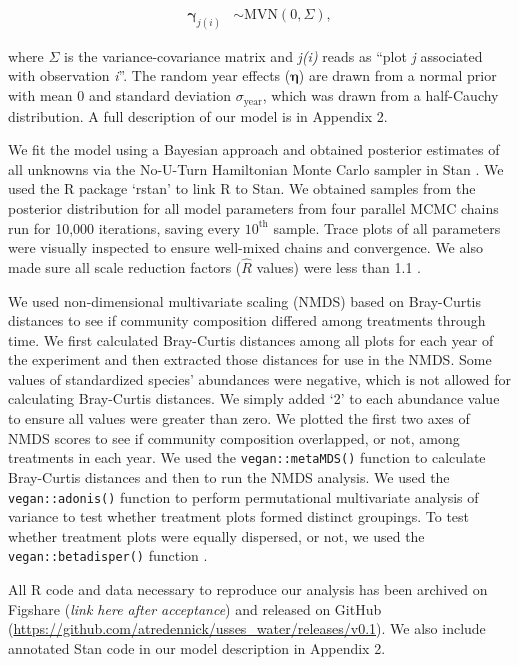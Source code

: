 \documentclass[fleqn,10pt,lineno]{wlpeerj} %
\begin{document}
\begin{align}
\boldsymbol{\gamma}_{j(i)} &\sim \text{MVN} \left( 0, \Sigma  \right),
\end{align}

\noindent{}where \(\Sigma\) is the variance-covariance matrix and
\emph{j(i)} reads as ``plot \emph{j} associated with observation
\emph{i}''. The random year effects (\(\boldsymbol{\eta}\)) are drawn
from a normal prior with mean 0 and standard deviation
\(\sigma_{\text{year}}\), which was drawn from a half-Cauchy
distribution. A full description of our model is in Appendix 2.

We fit the model using a Bayesian approach and obtained posterior
estimates of all unknowns via the No-U-Turn Hamiltonian Monte Carlo
sampler in Stan \citep{stan2016}. We used the R package `rstan'
\citep{rstan2016} to link R \citep{R2016} to Stan. We obtained samples
from the posterior distribution for all model parameters from four
parallel MCMC chains run for 10,000 iterations, saving every
\(10^{\text{th}}\) sample. Trace plots of all parameters were visually
inspected to ensure well-mixed chains and convergence. We also made sure
all scale reduction factors (\(\hat{R}\) values) were less than 1.1
\citep{Gelman2009}.

We used non-dimensional multivariate scaling (NMDS) based on Bray-Curtis
distances to see if community composition differed among treatments
through time. We first calculated Bray-Curtis distances among all plots
for each year of the experiment and then extracted those distances for
use in the NMDS. Some values of standardized species' abundances were
negative, which is not allowed for calculating Bray-Curtis distances. We
simply added `2' to each abundance value to ensure all values were
greater than zero. We plotted the first two axes of NMDS scores to see
if community composition overlapped, or not, among treatments in each
year. We used the \texttt{vegan::metaMDS()} function \citep{Oksanen2016}
to calculate Bray-Curtis distances and then to run the NMDS analysis. We
used the \texttt{vegan::adonis()} function \citep{Oksanen2016} to
perform permutational multivariate analysis of variance to test whether
treatment plots formed distinct groupings. To test whether treatment
plots were equally dispersed, or not, we used the
\texttt{vegan::betadisper()} function \citep{Oksanen2016}.

All R code and data necessary to reproduce our analysis has been
archived on Figshare (\emph{link here after acceptance}) and released on
GitHub (\url{https://github.com/atredennick/usses_water/releases/v0.1}).
We also include annotated Stan code in our model description in Appendix
2.
\end{document}
